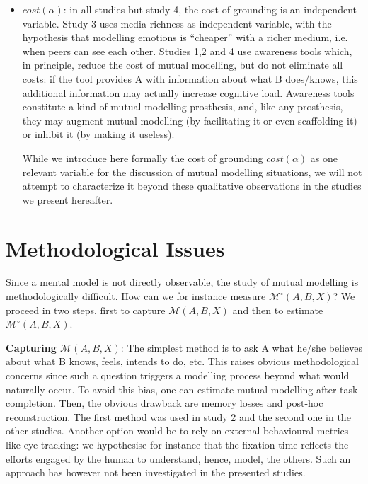 \documentclass[natbib]{svjour3}
\newcommand{\ie}{i.e.\xspace}
\newcommand{\A}{A\xspace}
\newcommand{\B}{B\xspace}
\newcommand{\model}[3]{{$\mathcal{M}(#1, #2, #3)$}}
\newcommand{\Model}[3]{{$\mathcal{M}^{\circ}(#1, #2, #3)$}}
\begin{document}
\begin{itemize}
    \item $cost(\alpha)$: in all studies but study 4, the cost of  grounding is
        an independent variable. Study 3 uses media richness as independent
        variable, with the hypothesis that modelling emotions is ``cheaper'' with a
        richer medium, \ie  when peers can see each other.  Studies 1,2 and 4
        use awareness tools which, in principle, reduce the cost of mutual modelling, but do
        not eliminate all costs: if the tool provides \A with information about
        what \B does/knows, this additional information may actually increase
        cognitive load. Awareness tools constitute a kind of mutual modelling prosthesis,
        and, like any prosthesis, they may augment mutual modelling (by facilitating it or
        even scaffolding it) or inhibit it (by making it useless).

        While we introduce here formally the cost of grounding $cost(\alpha)$ as
        one relevant variable for the discussion of mutual modelling situations,
        we will not attempt to characterize it beyond these qualitative
        observations in the studies we present hereafter.

\end{itemize}


\section{Methodological Issues}

Since a mental model is not directly observable,  the study of mutual modelling
is methodologically difficult. How can we for instance measure \Model{A}{B}{X}?
We proceed in two steps, first to capture \model{A}{B}{X} and then to estimate
\Model{A}{B}{X}. 

{\bf Capturing \model{A}{B}{X}}: The simplest method is to ask \A what he/she
believes about what \B knows, feels, intends to do, etc.  This raises obvious
methodological concerns since such a question triggers a modelling process
beyond what would naturally occur. To avoid this bias, one can estimate mutual
modelling after task completion. Then, the obvious drawback are memory losses
and post-hoc reconstruction. The first method was used in study 2 and the
second one in the other studies. Another option would be to rely on external
behavioural metrics like eye-tracking: we hypothesise for instance that the
fixation time reflects the efforts engaged by the human to understand, hence,
model, the others. Such an approach has however not been investigated in the
presented studies.
\end{document}
